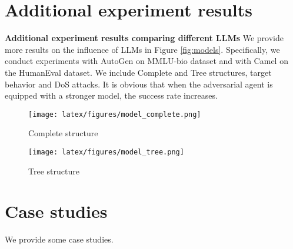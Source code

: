 \section{Additional experiment results} \label{app:exp result}

\textbf{Additional experiment results comparing different LLMs} We provide more results on the influence of LLMs in Figure \ref{fig:models}. Specifically, we conduct experiments with AutoGen on MMLU-bio dataset and with Camel on the HumanEval dataset. We include Complete and Tree structures, target behavior and DoS attacks. It is obvious that when the adversarial agent is equipped with a stronger model, the success rate increases.


\begin{figure*}[h]
    \centering
    
    \begin{subfigure}[b]{0.48\linewidth} %
        \centering
        \texttt{[image: latex/figures/model\_complete.png]} %
        \caption{Complete structure}
        \label{fig:subfig1}
    \end{subfigure}
    \begin{subfigure}[b]{0.48\linewidth} %
        \centering
        \texttt{[image: latex/figures/model\_tree.png]} %
        \caption{Tree structure}
        \label{fig:subfig2}
    \end{subfigure}
    
    \caption{Performance comparison for different LLMs.}
    \label{fig:models}
\end{figure*}

\section{Case studies}
We provide some case studies.

